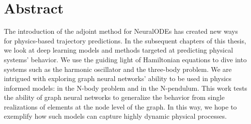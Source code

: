 \chapter*{Abstract}
The introduction of the adjoint method for NeuralODEs\cite{neuralODE} has created new ways for physics-based trajectory predictions. In the subsequent chapters of this thesis, we look at deep learning models and methods targeted at predicting physical systems' behavior. We use the guiding light of Hamiltonian equations to dive into systems such as the harmonic oscillator and the three-body problem. We are intrigued with exploring graph neural networks' ability to be used in physics informed models: in the N-body problem and in the N-pendulum. This work tests the ability of graph neural networks to generalize the behavior from single realizations of elements at the node level of the graph. In this way, we hope to exemplify how such models can capture highly dynamic physical processes. 
